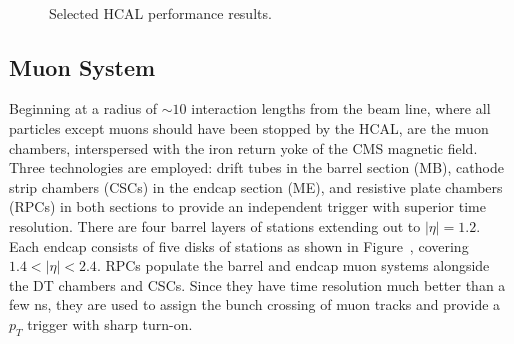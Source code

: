\documentclass[dissertation.tex]{subfiles}
\begin{document}
\begin{figure}
	\\
	\caption{Selected HCAL performance results.}
	\label{fig:HCAL_performance}
\end{figure}

\subsection{Muon System}

Beginning at a radius of $\sim10$ interaction lengths from the beam line, where all particles except muons should have been stopped by the HCAL, are the muon chambers, interspersed with the iron return yoke of the CMS magnetic field.  Three technologies are employed: drift tubes in the barrel section (MB), cathode strip chambers (CSCs) in the endcap section (ME), and resistive plate chambers (RPCs) in both sections to provide an independent trigger with superior time resolution.  There are four barrel layers of stations extending out to $|\eta| = 1.2$.  Each endcap consists of five disks of stations as shown in Figure~, covering $1.4 < |\eta| < 2.4$.  RPCs populate the barrel and endcap muon systems alongside the DT chambers and CSCs.  Since they have time resolution much better than a few ns, they are used to assign the bunch crossing of muon tracks and provide a $p_{T}$ trigger with sharp turn-on.
\end{document}
